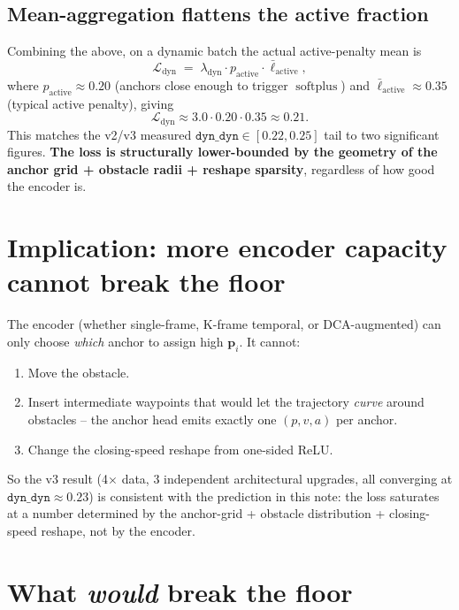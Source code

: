 \documentclass[11pt]{article}
\newcommand{\softplus}{\operatorname{softplus}}
\begin{document}
\subsection{Mean-aggregation flattens the active fraction}

Combining the above, on a dynamic batch the actual active-penalty mean is
\[
\mathcal{L}_{\text{dyn}}
\;=\; \lambda_{\text{dyn}} \cdot p_{\text{active}} \cdot \bar{\ell}_{\text{active}},
\]
where $p_{\text{active}} \approx 0.20$ (anchors close enough to trigger
$\softplus$) and $\bar{\ell}_{\text{active}} \approx 0.35$ (typical active
penalty), giving
\[
\mathcal{L}_{\text{dyn}} \approx 3.0 \cdot 0.20 \cdot 0.35 \approx 0.21.
\]
This matches the v2/v3 measured $\texttt{dyn\_dyn} \in [0.22, 0.25]$ tail to
two significant figures. \textbf{The loss is structurally lower-bounded by the
geometry of the anchor grid + obstacle radii + reshape sparsity}, regardless of
how good the encoder is.

\section{Implication: more encoder capacity cannot break the floor}

The encoder (whether single-frame, K-frame temporal, or DCA-augmented) can only
choose \emph{which} anchor to assign high $\bm{p}_i$. It cannot:
\begin{enumerate}
  \item Move the obstacle.
  \item Insert intermediate waypoints that would let the trajectory \emph{curve}
        around obstacles -- the anchor head emits exactly one $(p, v, a)$ per
        anchor.
  \item Change the closing-speed reshape from one-sided ReLU.
\end{enumerate}

So the v3 result (4$\times$ data, 3 independent architectural upgrades, all
converging at $\texttt{dyn\_dyn} \approx 0.23$) is consistent with the
prediction in this note: the loss saturates at a number determined by the
anchor-grid + obstacle distribution + closing-speed reshape, not by the
encoder.

\section{What \emph{would} break the floor}
\end{document}

